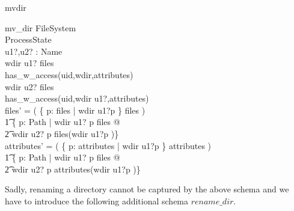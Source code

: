 \begin{doc}{mvdir}
 \begin{schema}{mv\_dir}
    \Delta FileSystem \\
    \Xi ProcessState \\
    u1?,u2? : Name \\
    \where
    wdir \cat\langle u1? \rangle \isin files \\
    has\_w\_access(uid,wdir,attributes) \\                                      

    wdir \cat \langle u2? \rangle \isdirin files \\
    has\_w\_access(uid,wdir \cat \langle u1?\rangle,attributes) \\

    files' = ( \{ p: \dom files | wdir \cat \langle u1?\rangle \prefix p \}
    \ndres files ) \\
    \t1 \oplus  \{ p: Path | wdir \cat \langle u1? \rangle \cat p \isin files @
    \\
    \t2 wdir \cat \langle u2? \rangle \cat p  \mapsto files(wdir \cat \langle
    u1?\rangle \cat p )\} \\

    attributes' = ( \{ p: \dom attributes | wdir \cat \langle u1?\rangle \prefix p \}
    \ndres attributes ) \\
    \t1 \oplus  \{ p: Path | wdir \cat \langle u1? \rangle \cat p \isin files @
    \\
    \t2 wdir \cat \langle u2? \rangle \cat p \mapsto attributes(wdir \cat \langle
    u1?\rangle \cat p )\} \\
  \end{schema}
\end{doc}
Sadly, renaming a directory cannot be captured by the above schema and we have
to introduce the following additional schema $rename\_dir$.
